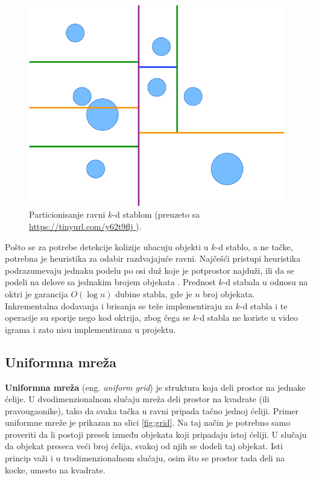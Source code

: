 \documentclass[12pt,oneside]{memoir}
\begin{document}
\begin{figure}[h!]
	\centering
	\includegraphics[scale=0.5]{kdtree.png}
	\caption{Particionisanje ravni $k$-d stablom (preuzeto sa \url{ https://tinyurl.com/y62t9flj }). }
	\label{fig:kdtree}
\end{figure}

Pošto se za potrebe detekcije kolizije ubacuju objekti u $k$-d stablo, a ne tačke, potrebna je heuristika za odabir razdvajajuće ravni. 
Najčešći pristupi heuristika podrazumevaju jednaku podelu po osi duž koje je potprostor najduži, 
ili da se podeli na delove sa jednakim brojem objekata \cite{kdtree}.
Prednost $k$-d  stabala u odnosu na oktri je garancija $O(\log n )$ dubine stabla, gde je $n$ broj objekata.
Inkrementalna dodavanja i brisanja se teže implementiraju za $k$-d stabla i te operacije su sporije nego kod oktrija,
zbog čega se $k$-d stabla ne koriste u video igrama i zato nisu implementirana u projektu.

\subsection{Uniformna mreža}
\label{subsec:grid}

\textbf{Uniformna mreža} (eng. {\em uniform grid}) je struktura koja deli prostor na jednake ćelije.
U dvodimenzionalnom slučaju mreža deli prostor na kvadrate (ili pravougaonike), tako da svaka tačka u ravni 
pripada tačno jednoj ćeliji. Primer uniformne mreže je prikazan na slici \ref{fig:grid}.
Na taj način je potrebno samo proveriti da li postoji presek između objekata koji pripadaju istoj ćeliji.
U slučaju da objekat preseca veći broj ćelija, svakoj od njih se dodeli taj objekat.
Isti princip važi i u trodimenzionalnom slučaju, osim što se prostor tada deli na kocke, umesto na kvadrate. 
\end{document}
